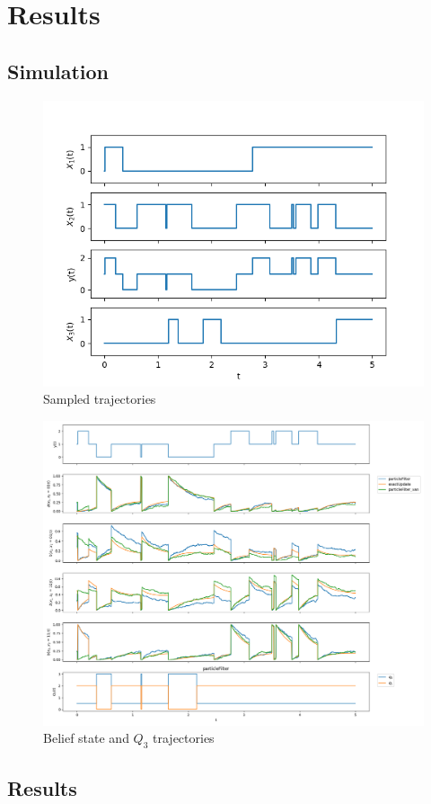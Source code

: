 \chapter{Results}


\section{Simulation}
\begin{figure}[htb]
	\begin{center}
		\includegraphics[width=.50\textwidth]{figures/traj}
		\caption{Sampled trajectories}
		\label{fig:traj}
	\end{center}
\end{figure}
\begin{figure}[htb]
	\begin{center}
		\includegraphics[width=.50\textwidth]{figures/b_q_traj}
		\caption{Belief state and $ Q_3 $ trajectories}
		\label{fig:b_q_traj}
	\end{center}
\end{figure}

\section{Results}
